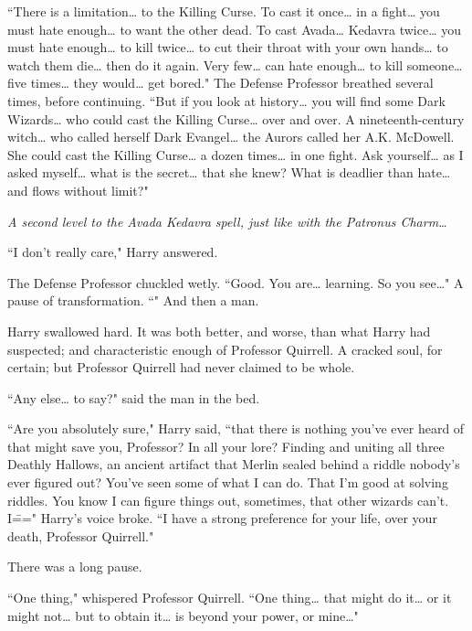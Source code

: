 ``There is a limitation{\ldots} to the Killing Curse. To cast it once{\ldots} in a fight{\ldots} you must hate enough{\ldots} to want the other dead. To cast Avada{\ldots} Kedavra twice{\ldots} you must hate enough{\ldots} to kill twice{\ldots} to cut their throat with your own hands{\ldots} to watch them die{\ldots} then do it again. Very few{\ldots} can hate enough{\ldots} to kill someone{\ldots} five times{\ldots} they would{\ldots} get bored." The Defense Professor breathed several times, before continuing. ``But if you look at history{\ldots} you will find some Dark Wizards{\ldots} who could cast the Killing Curse{\ldots} over and over. A nineteenth-century witch{\ldots} who called herself Dark Evangel{\ldots} the Aurors called her A.\?K. McDowell. She could cast the Killing Curse{\ldots} a dozen times{\ldots} in one fight. Ask yourself{\ldots} as I asked myself{\ldots} what is the secret{\ldots} that she knew? What is deadlier than hate{\ldots} and flows without limit?"

\emph{A second level to the Avada Kedavra spell, just like with the Patronus Charm{\ldots}}

``I don't really care," Harry answered.

The Defense Professor chuckled wetly. ``Good. You are{\ldots} learning. So you see{\ldots}" A pause of transformation. ``" And then a man.

Harry swallowed hard. It was both better, and worse, than what Harry had suspected; and characteristic enough of Professor Quirrell. A cracked soul, for certain; but Professor Quirrell had never claimed to be whole.

``Any else{\ldots} to say?" said the man in the bed.

``Are you absolutely sure," Harry said, ``that there is nothing you've ever heard of that might save you, Professor? In all your lore? Finding and uniting all three Deathly Hallows, an ancient artifact that Merlin sealed behind a riddle nobody's ever figured out? You've seen some of what I can do. That I'm good at solving riddles. You know I can figure things out, sometimes, that other wizards can't. I\===" Harry's voice broke. ``I have a strong preference for your life, over your death, Professor Quirrell."

There was a long pause.

``One thing," whispered Professor Quirrell. ``One thing{\ldots} that might do it{\ldots} or it might not{\ldots} but to obtain it{\ldots} is beyond your power, or mine{\ldots}"

